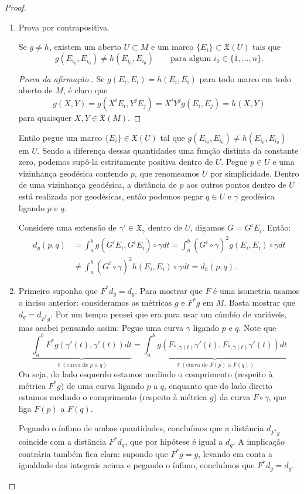 \begin{proof}\leavevmode
\begin{enumerate}[label=(\alph*)]
\item  Prova por contrapositiva.
	\begin{claim}\leavevmode
	Se \(g \neq h\), existem um aberto \(U\subset M\) e um marco \(\{E_i\}\subset \mathfrak{X}(U)\) tais que
	\[g(E_{i_0},E_{i_0}) \neq  h(E_{i_0},E_{i_0})\qquad \text{para algum } i_0\in \{1,\ldots,n\}.\]
	\end{claim}
	\begin{proof}[Prova da afirmação.]\leavevmode
	Se \(g(E_i,E_i)=h(E_i,E_i)\) para todo marco em todo aberto de \(M\), é claro que \[g(X,Y)=g(X^iE_i,Y^jE_j)=X^iY^jg(E_i,E_j)=h(X,Y)\]
para quaisquer \(X,Y \in \mathfrak{X}(M)\).
	\end{proof}
	Então pegue um marco \(\{E_i\} \in \mathfrak{X}(U)\) tal que \(g(E_{i_0},E_{i_0})\neq h(E_{i_0},E_{i_0})\) em \(U\). Sendo a diferença dessas quantidades uma função distinta da constante zero, podemos supô-la estritamente positiva dentro de \(U\). Pegue \(p \in U\) e uma vizinhança geodésica contendo \(p\), que renomeamos \(U\) por simplicidade. Dentro de uma vizinhança geodésica, a distância de \(p\) aos outros pontos dentro de \(U\) está realizada por geodésicas, então podemos pegar \(q \in U\) e \(\gamma\) geodésica ligando \(p\) e \(q\).

	Considere uma extensão de \(\gamma'\in \mathfrak{X}_\gamma\) dentro de \(U\), digamos \(G=G^iE_i\). Então:
	\begin{align*}
	d_g(p,q)&=\int_a^b g(G^iE_i,G^iE_i) \circ \gamma dt=\int_a^b (G^i \circ \gamma)^2g(E_i,E_i) \circ \gamma dt\\&\neq \int_a^b(G^i \circ \gamma)^2 h(E_i,E_i)\circ \gamma dt = d_h(p,q).
	\end{align*}

\item Primeiro suponha que \(F^*d_g=d_g\). Para mostrar que \(F\) é uma isometria usamos o inciso anterior: consideramos as métricas \(g\) e \(F^*g\) em \(M\). Basta mostrar que \(d_g=d_{F^*g}\). Por um tempo pensei que era para usar um câmbio de variáveis, mas acabei pensando assim: Pegue uma curva \(\gamma\) ligando \(p\) e \(q\). Note que
	\[\underbrace{\int_a^bF^* g(\gamma'(t),\gamma'(t))dt}_{\ell(\text{curva de \(p\) a \(q\)} )}=\underbrace{\int_a^bg(F_{*,\gamma(t)}\gamma'(t),F_{*,\gamma(t)}\gamma'(t))dt}_{\ell(\text{curva de \(F(p)\) a \(F(q)\)} )}\]
Ou seja, do lado esquerdo estamos medindo o comprimento (respeito à métrica \(F^*g\)) de uma curva ligando \(p\) a \(q\), enquanto que do lado direito estamos medindo o comprimento (respeito à métrica \(g\)) da curva \(F\circ \gamma\), que liga \(F(p)\) a \(F(q)\).

Pegando o ínfimo de ambas quantidades, concluímos que a distância \(d_{F^*g}\) coincide com a distância \(F^*d_g\), que por hipótese é igual a \(d_g\). A implicação contrária também fica clara: supondo que \(F^*g=g\), levando em conta a igualdade das integrais acima e pegando o ínfimo, concluímos que \(F^*d_g=d_g\).
\end{enumerate}
\end{proof}

